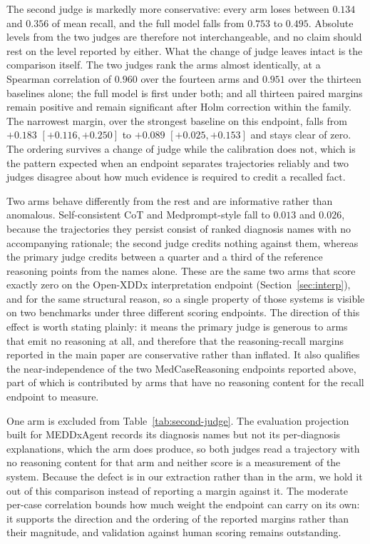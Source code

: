 \documentclass[letterpaper]{article}
\begin{document}
The second judge is markedly more conservative: every arm loses between $0.134$ and $0.356$ of mean recall, and the full model falls from $0.753$ to $0.495$.
Absolute levels from the two judges are therefore not interchangeable, and no claim should rest on the level reported by either.
What the change of judge leaves intact is the comparison itself.
The two judges rank the arms almost identically, at a Spearman correlation of $0.960$ over the fourteen arms and $0.951$ over the thirteen baselines alone; the full model is first under both; and all thirteen paired margins remain positive and remain significant after Holm correction within the family.
The narrowest margin, over the strongest baseline on this endpoint, falls from $+0.183$ $[+0.116,+0.250]$ to $+0.089$ $[+0.025,+0.153]$ and stays clear of zero.
The ordering survives a change of judge while the calibration does not, which is the pattern expected when an endpoint separates trajectories reliably and two judges disagree about how much evidence is required to credit a recalled fact.

Two arms behave differently from the rest and are informative rather than anomalous.
Self-consistent CoT and Medprompt-style fall to $0.013$ and $0.026$, because the trajectories they persist consist of ranked diagnosis names with no accompanying rationale; the second judge credits nothing against them, whereas the primary judge credits between a quarter and a third of the reference reasoning points from the names alone.
These are the same two arms that score exactly zero on the Open-XDDx interpretation endpoint (Section~\ref{sec:interp}), and for the same structural reason, so a single property of those systems is visible on two benchmarks under three different scoring endpoints.
The direction of this effect is worth stating plainly: it means the primary judge is generous to arms that emit no reasoning at all, and therefore that the reasoning-recall margins reported in the main paper are conservative rather than inflated.
It also qualifies the near-independence of the two MedCaseReasoning endpoints reported above, part of which is contributed by arms that have no reasoning content for the recall endpoint to measure.

One arm is excluded from Table~\ref{tab:second-judge}.
The evaluation projection built for MEDDxAgent records its diagnosis names but not its per-diagnosis explanations, which the arm does produce, so both judges read a trajectory with no reasoning content for that arm and neither score is a measurement of the system.
Because the defect is in our extraction rather than in the arm, we hold it out of this comparison instead of reporting a margin against it.
The moderate per-case correlation bounds how much weight the endpoint can carry on its own: it supports the direction and the ordering of the reported margins rather than their magnitude, and validation against human scoring remains outstanding.
\end{document}
